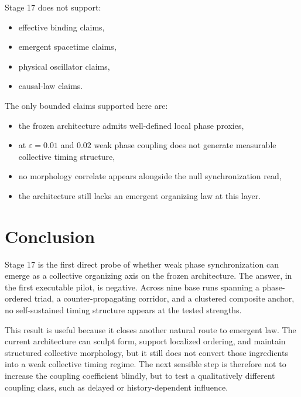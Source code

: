 \documentclass[11pt]{article}
\begin{document}
Stage 17 does not support:
\begin{itemize}
\item effective binding claims,
\item emergent spacetime claims,
\item physical oscillator claims,
\item causal-law claims.
\end{itemize}

The only bounded claims supported here are:
\begin{itemize}
\item the frozen architecture admits well-defined local phase proxies,
\item at $\varepsilon=0.01$ and $0.02$ weak phase coupling does not generate measurable collective timing structure,
\item no morphology correlate appears alongside the null synchronization read,
\item the architecture still lacks an emergent organizing law at this layer.
\end{itemize}

\section{Conclusion}

Stage 17 is the first direct probe of whether weak phase synchronization can emerge as a collective organizing axis on the frozen architecture. The answer, in the first executable pilot, is negative. Across nine base runs spanning a phase-ordered triad, a counter-propagating corridor, and a clustered composite anchor, no self-sustained timing structure appears at the tested strengths.

This result is useful because it closes another natural route to emergent law. The current architecture can sculpt form, support localized ordering, and maintain structured collective morphology, but it still does not convert those ingredients into a weak collective timing regime. The next sensible step is therefore not to increase the coupling coefficient blindly, but to test a qualitatively different coupling class, such as delayed or history-dependent influence.
\end{document}

